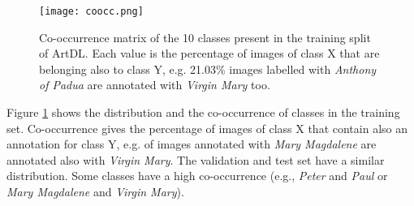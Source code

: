 \documentclass[acmlarge]{acmart}
\begin{document}
\begin{comment}
\begin{table}[ht]
\centering
\begin{tabularx}{\linewidth}{|c|X|X|X|X|X|X|X|X|X|X|}
\hline
 & Cath. & Franc. & Jer. & John & Jos. & Magdal. & Paul & Peter & Seb. & Mary \\ \hline
Cath. & 1437 & 44 & 34 & 72 & 98 & 80 & 32 & 55 & 26 & 528 \\ \hline
Franc. & 44 & 1576 & 66 & 72 & 75 & 54 & 32 & 50 & 17 & 446 \\ \hline
Jer. & 34 & 66 & 1590 & 70 & 35 & 42 & 30 & 40 & 16 & 347 \\ \hline
John & 72 & 72 & 70 & 1561 & 54 & 75 & 66 & 103 & 31 & 499 \\ \hline
Jos. & 98 & 75 & 35 & 54 & 5955 & 145 & 32 & 54 & 11 & 4816 \\ \hline
Magdal. & 80 & 54 & 42 & 75 & 145 & 2420 & 29 & 60 & 17 & 1578 \\ \hline
Paul & 32 & 32 & 30 & 66 & 32 & 29 & 1171 & 355 & 8 & 241 \\ \hline
Peter & 55 & 50 & 40 & 103 & 54 & 60 & 355 & 2204 & 18 & 425 \\ \hline
Seb. & 26 & 17 & 16 & 31 & 11 & 17 & 8 & 18 & 775 & 166 \\ \hline
Mary & 528 & 446 & 347 & 499 & 4816 & 1578 & 241 & 425 & 166 & 20687 \\ \hline
\end{tabularx}\caption{Co-occurrence matrix of the 10 classes of ArtDL.}
\label{tab:cooc_table}
\end{table}
\end{comment}

\begin{figure}[t]
    \centering
    \texttt{[image: coocc.png]}
    \caption{Co-occurrence matrix of the 10 classes present in the training split of ArtDL. Each value is the percentage of images of class X that are belonging also to class Y, e.g. 21.03\% images labelled with \textit{Anthony of Padua} are annotated with \textit{Virgin Mary} too.
    }
    \label{figure:coocc}
\end{figure}

Figure \ref{figure:coocc} shows the distribution and the co-occurrence of classes in the training set. Co-occurrence  gives the percentage of images of class X that contain also an annotation for class Y, e.g.  of images annotated with \textit{Mary Magdalene} are annotated also with \textit{Virgin Mary}. The validation and test set have a similar distribution. Some classes have a high co-occurrence (e.g., \textit{Peter} and \textit{Paul} or \textit{Mary Magdalene} and \textit{Virgin Mary}). 
\end{document}
